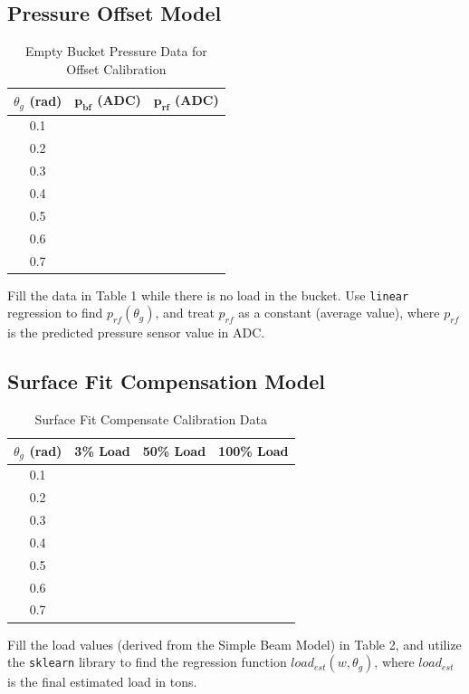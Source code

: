 \documentclass[12pt, a4paper]{article}
\begin{document}
\subsection{Pressure Offset Model}
\begin{table}[H]
    \centering
    \caption{Empty Bucket Pressure Data for Offset Calibration}
    \begin{tabular}{c|c|c}
        \hline
        $\theta_g$ \textbf{(rad)} & $\mathbf{p_{bf}}$ \textbf{(ADC)} & $\mathbf{p_{rf}}$ \textbf{(ADC)} \\
        \hline
        0.1 & & \\
        0.2 & & \\
        0.3 & & \\
        0.4 & & \\
        0.5 & & \\
        0.6 & & \\
        0.7 & & \\
        \hline
    \end{tabular}
\end{table}

Fill the data in Table 1 while there is no load in the bucket. Use \texttt{linear} regression to find $p_{rf}(\theta_g)$, and treat $p_{rf}$ as a constant (average value), where $p_{rf}$ is the predicted pressure sensor value in ADC.

\subsection{Surface Fit Compensation Model}
\begin{table}[H]
    \centering
    \caption{Surface Fit Compensate Calibration Data}
    \begin{tabular}{c|c|c|c}
        \hline
        $\theta_g$ \textbf{(rad)} & \textbf{3\% Load} & \textbf{50\% Load} & \textbf{100\% Load} \\
        \hline
        0.1 & & & \\
        0.2 & & & \\
        0.3 & & & \\
        0.4 & & & \\
        0.5 & & & \\
        0.6 & & & \\
        0.7 & & & \\
        \hline
    \end{tabular}
\end{table}

Fill the load values (derived from the Simple Beam Model) in Table 2, and utilize the \texttt{sklearn} library to find the regression function $load_{est}(w, \theta_g)$, where $load_{est}$ is the final estimated load in tons.
\end{document}
